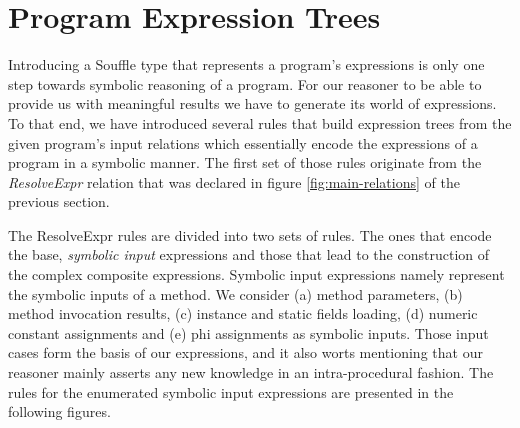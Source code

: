 \section{Program Expression Trees}


Introducing a Souffle type that represents a program's expressions is only one
step towards symbolic reasoning of a program. For our reasoner to be able to provide us
with meaningful results we have to generate its world of expressions. To that end, we
have introduced several rules that build expression trees from the given program's
input relations which essentially encode the expressions of a program in a symbolic
manner. The first set of those rules originate from the \emph{ResolveExpr} relation
that was declared in figure \ref{fig:main-relations} of the previous section.

The ResolveExpr rules are divided into two sets of rules. The ones that encode
the base, \emph{symbolic input} expressions and those that lead to the construction of the
complex composite expressions. Symbolic input expressions namely represent the
symbolic inputs of a method. We consider (a) method parameters, (b) method invocation
results, (c) instance and static fields loading, (d) numeric constant assignments and
(e) phi assignments as symbolic inputs. Those input cases form the basis of our
expressions, and it also worts mentioning that our reasoner mainly asserts any new
knowledge in an intra-procedural fashion. The rules for the enumerated symbolic
input expressions are presented in the following figures.

